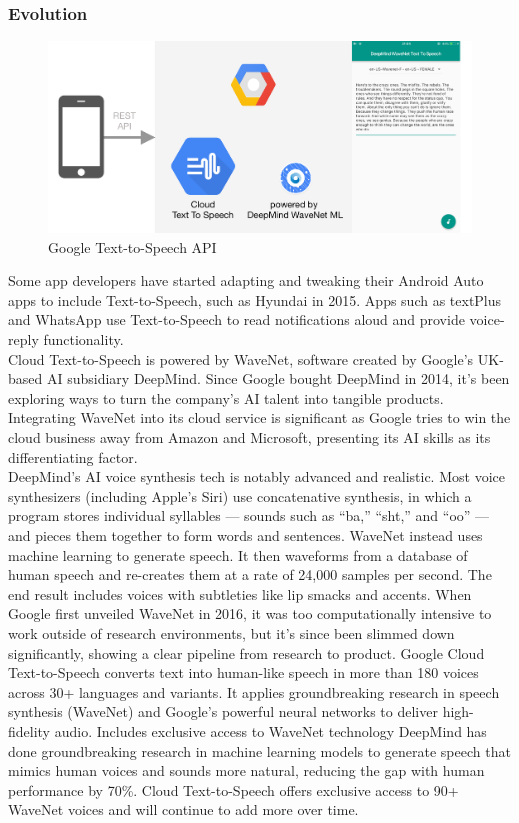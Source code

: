 \documentclass[14pt]{report}
\begin{document}
					\subsubsection{Evolution}
						\begin{figure}[b]
							\includegraphics[width=14cm]{cloudtts.png}
							\centering
							\caption{Google Text-to-Speech API}
						\end{figure}
						Some app developers have started adapting and tweaking their Android Auto apps to include Text-to-Speech, such as Hyundai in 2015. Apps such as textPlus and WhatsApp use Text-to-Speech to read notifications aloud and provide voice-reply functionality.\\
						
						Cloud Text-to-Speech is powered by WaveNet, software created by Google's UK-based AI subsidiary DeepMind. Since Google bought DeepMind in 2014, it's been exploring ways to turn the company's AI talent into tangible products. Integrating WaveNet into its cloud service is significant as Google tries to win the cloud business away from Amazon and Microsoft, presenting its AI skills as its differentiating factor.\\
						
						DeepMind's AI voice synthesis tech is notably advanced and realistic. Most voice synthesizers (including Apple's Siri) use concatenative synthesis, in which a program stores individual syllables — sounds such as “ba,” “sht,” and “oo” — and pieces them together to form words and sentences. WaveNet instead uses machine learning to generate speech. It then waveforms from a database of human speech and re-creates them at a rate of 24,000 samples per second. The end result includes voices with subtleties like lip smacks and accents. When Google first unveiled WaveNet in 2016, it was too computationally intensive to work outside of research environments, but it's since been slimmed down significantly, showing a clear pipeline from research to product. Google Cloud Text-to-Speech converts text into human-like speech in more than 180 voices across 30+ languages and variants. It applies groundbreaking research in speech synthesis (WaveNet) and Google's powerful neural networks to deliver high-fidelity audio. Includes exclusive access to WaveNet technology DeepMind has done groundbreaking research in machine learning models to generate speech that mimics human voices and sounds more natural, reducing the gap with human performance by 70\%. Cloud Text-to-Speech offers exclusive access to 90+ WaveNet voices and will continue to add more over time.
\end{document}
